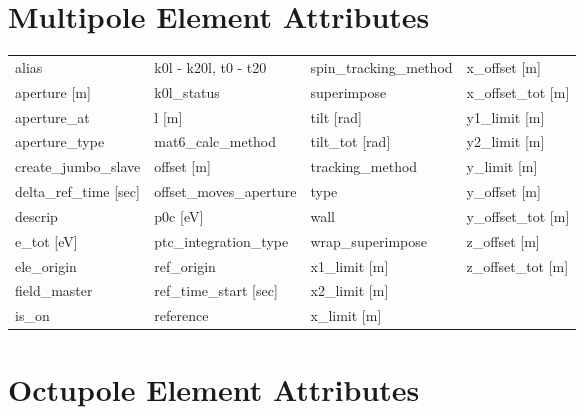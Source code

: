  \section{Multipole Element Attributes}
 \label{s:list.multipole}
 
 \begin{tabular}{llll} \toprule
alias                            & k0l - k20l, t0 - t20             & spin_tracking_method             & x_offset [m]                     \\
aperture [m]                     & k0l_status                       & superimpose                      & x_offset_tot [m]                 \\
aperture_at                      & l [m]                            & tilt [rad]                       & y1_limit [m]                     \\
aperture_type                    & mat6_calc_method                 & tilt_tot [rad]                   & y2_limit [m]                     \\
create_jumbo_slave               & offset [m]                       & tracking_method                  & y_limit [m]                      \\
delta_ref_time [sec]             & offset_moves_aperture            & type                             & y_offset [m]                     \\
descrip                          & p0c [eV]                         & wall                             & y_offset_tot [m]                 \\
e_tot [eV]                       & ptc_integration_type             & wrap_superimpose                 & z_offset [m]                     \\
ele_origin                       & ref_origin                       & x1_limit [m]                     & z_offset_tot [m]                 \\
field_master                     & ref_time_start [sec]             & x2_limit [m]                     &                                  \\
is_on                            & reference                        & x_limit [m]                      &                                  \\
 \bottomrule
 \end{tabular}
 \vfill
 
 \section{Octupole Element Attributes}
 \label{s:list.octupole}
 

